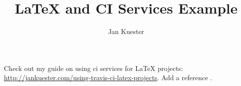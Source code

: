 \documentclass{article}
\title{LaTeX and CI Services Example}
\author{Jan Kuester}
\date{\version}
\begin{document}
\maketitle

Check out my guide on using ci services for LaTeX projects: \url{http://jankuester.com/using-travis-ci-latex-projects}. Add a reference \citep{modflow6gwf}.



\end{document}

